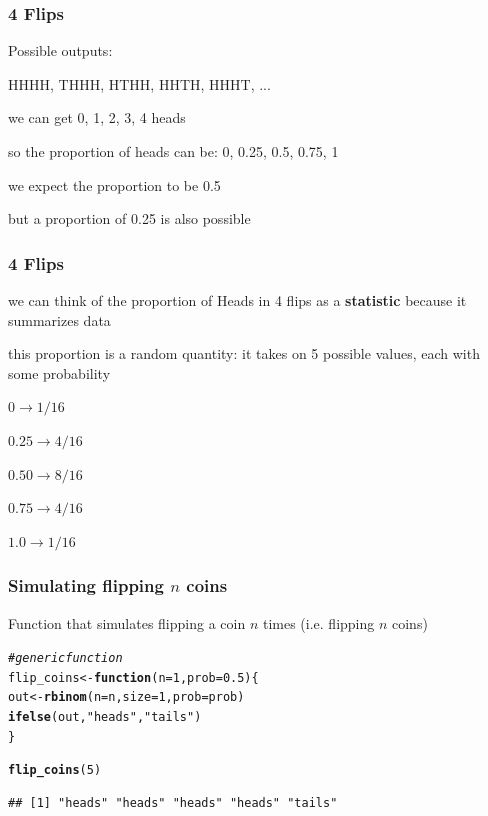 \documentclass[12pt]{beamer}\usepackage[]{graphicx}\usepackage[]{color}
\makeatletter
\newcommand{\hlnum}[1]{\textcolor[rgb]{0.686,0.059,0.569}{#1}}%
\newcommand{\hlstr}[1]{\textcolor[rgb]{0.192,0.494,0.8}{#1}}%
\newcommand{\hlcom}[1]{\textcolor[rgb]{0.678,0.584,0.686}{\textit{#1}}}%
\newcommand{\hlstd}[1]{\textcolor[rgb]{0.345,0.345,0.345}{#1}}%
\newcommand{\hlkwa}[1]{\textcolor[rgb]{0.161,0.373,0.58}{\textbf{#1}}}%
\newcommand{\hlkwb}[1]{\textcolor[rgb]{0.69,0.353,0.396}{#1}}%
\newcommand{\hlkwc}[1]{\textcolor[rgb]{0.333,0.667,0.333}{#1}}%
\newcommand{\hlkwd}[1]{\textcolor[rgb]{0.737,0.353,0.396}{\textbf{#1}}}%
\newenvironment{kframe}{%
 \def\at@end@of@kframe{}%
 \ifinner\ifhmode%
  \def\at@end@of@kframe{\end{minipage}}%
  \begin{minipage}{\columnwidth}%
 \fi\fi%
 \def\FrameCommand##1{\hskip\@totalleftmargin \hskip-\fboxsep
 \colorbox{shadecolor}{##1}\hskip-\fboxsep
     \hskip-\linewidth \hskip-\@totalleftmargin \hskip\columnwidth}%
 \MakeFramed {\advance\hsize-\width
   \@totalleftmargin\z@ \linewidth\hsize
   \@setminipage}}%
 {\par\unskip\endMakeFramed%
 \at@end@of@kframe}
\newenvironment{knitrout}{}{} %
\makeatother
\begin{document}
\begin{frame}[fragile]
\frametitle{4 Flips}

\bi
  \item Possible outputs:
  \bi
    \item HHHH, THHH, HTHH, HHTH, HHHT, ...
  \ei
  \item we can get 0, 1, 2, 3, 4 heads
  \item so the proportion of heads can be: 0, 0.25, 0.5, 0.75, 1
  \item we expect the proportion to be 0.5
  \item but a proportion of 0.25 is also possible
\ei
\eb

\end{frame}


\begin{frame}[fragile]
\frametitle{4 Flips}

\bbi
  \item we can think of the proportion of Heads in 4 flips as a \textbf{statistic} because it summarizes data 
  \item this proportion is a random quantity: it takes on 5 possible values, each with some probability
  \bi
    \item $0 \rightarrow 1/16$
    \item $0.25 \rightarrow 4/16$
    \item $0.50 \rightarrow 8/16$
    \item $0.75 \rightarrow 4/16$
    \item $1.0 \rightarrow 1/16$
  \ei
\ei

\end{frame}


\begin{frame}[fragile]
\frametitle{Simulating flipping $n$ coins}

Function that simulates flipping a coin $n$ times (i.e. flipping $n$ coins)
\begin{knitrout}\footnotesize
{}\color{fgcolor}\begin{kframe}
\begin{alltt}
\hlcom{# generic function}
\hlstd{flip_coins} \hlkwb{<-} \hlkwa{function}\hlstd{(}\hlkwc{n} \hlstd{=} \hlnum{1}\hlstd{,} \hlkwc{prob} \hlstd{=} \hlnum{0.5}\hlstd{) \{}
  \hlstd{out} \hlkwb{<-} \hlkwd{rbinom}\hlstd{(}\hlkwc{n} \hlstd{= n,} \hlkwc{size} \hlstd{=} \hlnum{1}\hlstd{,} \hlkwc{prob} \hlstd{= prob)}
  \hlkwd{ifelse}\hlstd{(out,} \hlstr{"heads"}\hlstd{,} \hlstr{"tails"}\hlstd{)}
\hlstd{\}}

\hlkwd{flip_coins}\hlstd{(}\hlnum{5}\hlstd{)}
\end{alltt}
\begin{verbatim}
## [1] "heads" "heads" "heads" "heads" "tails"
\end{verbatim}
\end{kframe}
\end{knitrout}

\end{frame}
\end{document}
